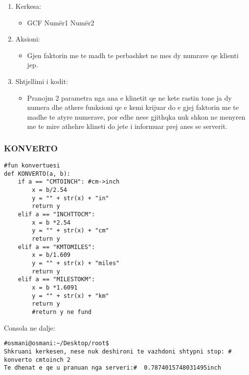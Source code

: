 \documentclass[]{article}
\begin{document}
\begin{enumerate}
\item Kerkesa:
\begin{itemize}
\item GCF  Numër1  Numër2
\end{itemize}
\item Aksioni:
\begin{itemize}
\item Gjen faktorin me te madh te perbashket ne mes dy numrave qe klienti jep.
\end{itemize}
\item Shtjellimi i kodit:
\begin{itemize}
\item Pranojm 2 parametra nga ana e klinetit qe ne kete rastin tone ja dy numera dhe athere funksioni qe e kemi krijuar do e gjej faktorin me te madhe te atyre numerave, por edhe nese gjithqka nuk shkon ne menyren me te mire athehre klineti do jete i informuar prej anes se serverit.
\end{itemize}
\end{enumerate}
\newpage
\subsubsection{KONVERTO}

\begin{lstlisting}
#fun konvertuesi
def KONVERTO(a, b):
    if a == "CMTOINCH": #cm->inch
        x = b/2.54
        y = "" + str(x) + "in"
        return y
    elif a == "INCHTTOCM":
        x = b *2.54
        y = "" + str(x) + "cm"
        return y
    elif a == "KMTOMILES":
        x = b/1.609
        y = "" + str(x) + "miles"
        return y
    elif a == "MILESTOKM":
        x = b *1.6091
        y = "" + str(x) + "km"
        return y
        #return y ne fund
\end{lstlisting}
\vspace{1cm}
\noindent Consola ne dalje:
\begin{lstlisting}
#osmani@osmani:~/Desktop/root$
Shkruani kerkesen, nese nuk deshironi te vazhdoni shtypni stop: # konverto cmtoinch 2
Te dhenat e qe u pranuan nga serveri:#  0.7874015748031495inch


\end{lstlisting}
\end{document}
